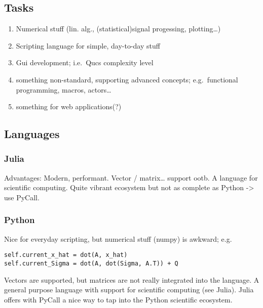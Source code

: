 
\subsection{Tasks}\label{tasks}

\begin{enumerate}
\def\labelenumi{\arabic{enumi}.}
\item
  Numerical stuff (lin. alg., (statistical)signal progessing,
  plotting\ldots{})
\item
  Scripting language for simple, day-to-day stuff
\item
  Gui development; i.e.~Qucs complexity level
\item
  something non-standard, supporting advanced concepts; e.g.~functional
  programming, macros, actors\ldots{}
\item
  something for web applications(?)
\end{enumerate}

\subsection{Languages}\label{languages}

\subsubsection{Julia}\label{julia}

Advantages: Modern, performant. Vector / matrix\ldots{} support ootb. A
language for scientific computing. Quite vibrant ecosystem but not as
complete as Python -\textgreater{} use PyCall.

\subsubsection{Python}\label{python}

Nice for everyday scripting, but numerical stuff (numpy) is awkward;
e.g.

\begin{verbatim}
self.current_x_hat = dot(A, x_hat)
self.current_Sigma = dot(A, dot(Sigma, A.T)) + Q
\end{verbatim}

Vectors are supported, but matrices are not really integrated into the
language. A general purpose language with support for scientific
computing (see Julia). Julia offers with PyCall a nice way to tap into
the Python scientific ecosystem.

